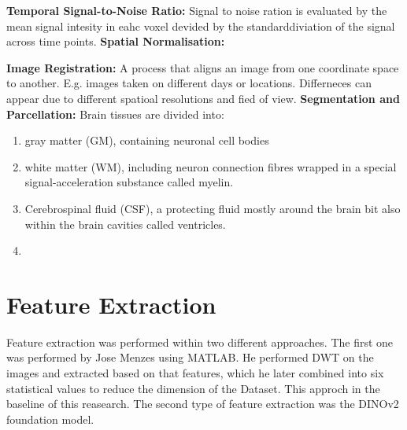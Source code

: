 \textbf{Temporal Signal-to-Noise Ratio:} Signal to noise ration is evaluated by the mean signal intesity in eahc voxel devided by the standarddiviation
of the signal across time points.
\textbf{Spatial Normalisation:} 

\textbf{Image Registration:} A process that aligns an image from one coordinate space to another. E.g. images taken on different days or locations.
Differneces can appear due to different spatioal resolutions and fied of view. 
\textbf{Segmentation and Parcellation:} 
Brain tissues are divided into:\\
\begin{enumerate}
    \item gray matter (GM), containing neuronal cell bodies
    \item white matter (WM), including neuron connection fibres wrapped in a special signal-acceleration substance called myelin. 
    \item Cerebrospinal fluid (CSF), a protecting fluid mostly around the brain bit also within the brain cavities called ventricles.
    \item 
\end{enumerate}





\section{Feature Extraction}
\label{sec:features}
Feature extraction was performed within two different approaches. The first one was performed by Jose Menzes using MATLAB. He performed DWT on the images and 
extracted based on that features, which he later combined into six statistical values to reduce the dimension of the Dataset. This approch in the baseline of this reasearch. 
The second type of feature extraction was the DINOv2 foundation model. 

